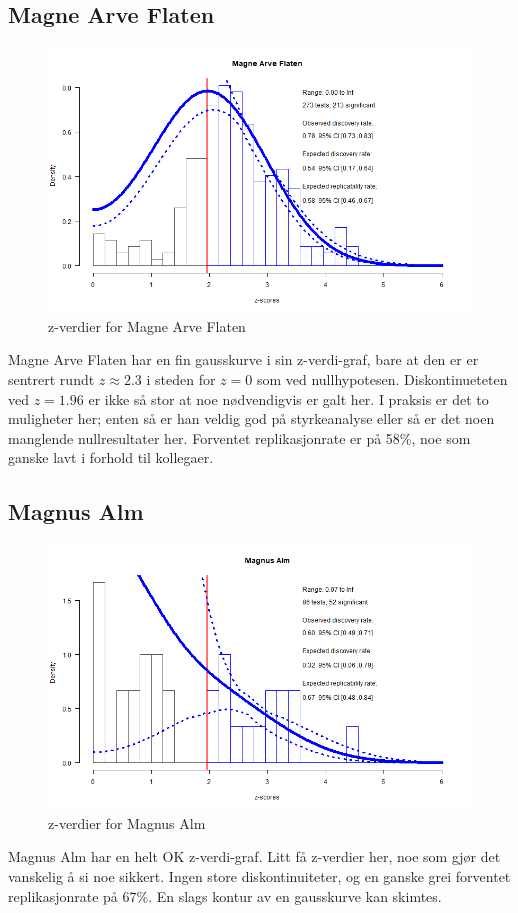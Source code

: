 \documentclass[doc,norsk]{apa7}
\begin{document}
\subsection{Magne Arve Flaten}
\begin{figure}[h!]
    \centering
    \includegraphics[width=\textwidth]{images/Magne Arve Flaten.png}
    \caption{z-verdier for Magne Arve Flaten}
\end{figure}
Magne Arve Flaten har en fin gausskurve i sin z-verdi-graf, bare at den er er sentrert rundt $z \approx 2.3$ i steden for $z = 0$ som ved nullhypotesen. Diskontinueteten ved $z = 1.96$ er ikke så stor at noe nødvendigvis er galt her. I praksis er det to muligheter her; enten så er han veldig god på styrkeanalyse eller så er det noen manglende nullresultater her. Forventet replikasjonrate er på 58\%, noe som ganske lavt i forhold til kollegaer.

\subsection{Magnus Alm}
\begin{figure}[h!]
    \centering
    \includegraphics[width=\textwidth]{images/Magnus Alm.png}
    \caption{z-verdier for Magnus Alm}
\end{figure}
Magnus Alm har en helt OK z-verdi-graf. Litt få z-verdier her, noe som gjør det vanskelig å si noe sikkert. Ingen store diskontinuiteter, og en ganske grei forventet replikasjonrate på 67\%. En slags kontur av en gausskurve kan skimtes.
\end{document}
